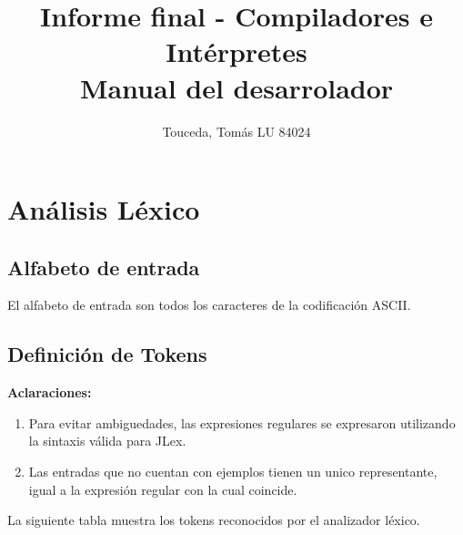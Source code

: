 \documentclass [a4paper,abstracton,titlepage]{scrartcl}
\title{Informe final - Compiladores e Intérpretes\\Manual del desarrolador}
\author{Touceda, Tomás LU 84024}
\begin{document}
\maketitle

\tableofcontents
\newpage

\section{Análisis Léxico}
\hypertarget{_alfabeto_de_entrada}{}
\subsection{Alfabeto de entrada}
\label{_alfabeto_de_entrada}
El alfabeto de entrada son todos los caracteres de la codificación ASCII.
\hypertarget{_definición_de_tokens}{}
\subsection{Definición de Tokens}
\label{_definición_de_tokens}
\textbf{Aclaraciones:}
  \begin{enumerate}
\item%
Para evitar ambiguedades, las expresiones regulares se expresaron
utilizando la sintaxis válida para JLex.

\item%
Las entradas que no cuentan con ejemplos tienen un unico
representante, igual a la expresión regular con la cual coincide.

\end{enumerate}
La siguiente tabla muestra los tokens reconocidos por el analizador léxico.
\end{document}
